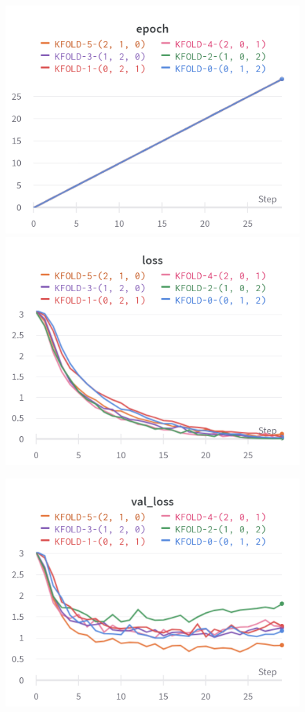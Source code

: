 \documentclass{article}
\begin{document}
\begin{figure}[!htb]
\includegraphics[width=\linewidth]{charts/Section-2-Panel-2-3xvgo30xh}
\caption{}
\endminipage\hfill
{}
\includegraphics[width=\linewidth]{charts/Section-2-Panel-3-36ugoh9u4}
\caption{}
\endminipage
\end{figure}

\begin{figure}[!htb]
\includegraphics[width=\linewidth]{charts/Section-2-Panel-4-z3qit6h96}
\caption{}
\endminipage
\end{figure}

\nocite{*}


\end{document}

